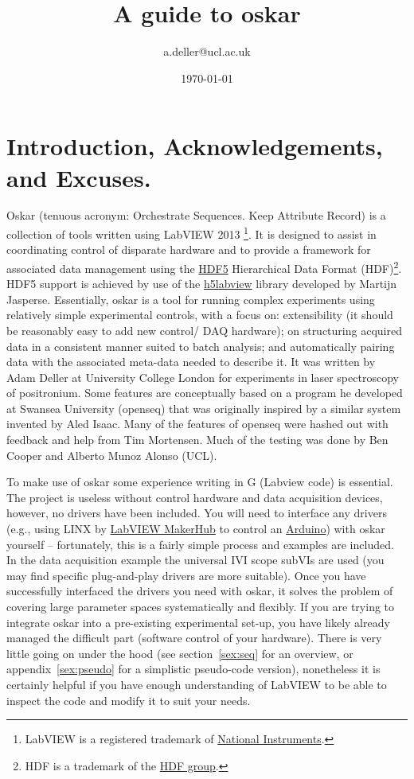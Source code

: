 \documentclass[10pt,a4paper]{article}
\title{A guide to oskar}
\author{a.deller@ucl.ac.uk}
\date{\today}
\begin{document}
\maketitle
\tableofcontents

\section{Introduction, Acknowledgements, and Excuses.}
Oskar (tenuous acronym: Orchestrate Sequences. Keep Attribute Record) is a collection of tools written using LabVIEW 2013 \footnote{LabVIEW is a registered trademark of \href{http://www.ni.com/}{National Instruments}.}. It is designed to assist in coordinating control of disparate hardware and to provide a framework for associated data management using the \href{https://www.hdfgroup.org/why_hdf/}{HDF5} Hierarchical Data Format (HDF)\footnote{HDF is a trademark of the \href{http://www.hdfgroup.org/}{HDF group}.}.   HDF5 support is achieved by use of the \href{http://h5labview.sourceforge.net/}{h5labview} library developed by Martijn Jasperse.  Essentially, oskar is a tool for running complex experiments using relatively simple experimental controls, with a focus on: extensibility (it should be reasonably easy to add new control/ DAQ hardware); on structuring acquired data in a consistent manner suited to batch analysis; and automatically pairing data with the associated meta-data needed to describe it.
It was written by Adam Deller at University College London for experiments in laser spectroscopy of positronium. Some features are conceptually based on a program he developed at Swansea University (openseq) that was originally inspired by a similar system invented by Aled Isaac.  Many of the features of openseq were hashed out with feedback and help from Tim Mortensen. Much of the testing was done by Ben Cooper and Alberto Munoz Alonso (UCL).

To make use of oskar some experience writing in G (Labview code) is essential. The project is useless without control hardware and data acquisition devices, however, no drivers have been included. You will need to interface any drivers (e.g., using  LINX by \href{https://www.labviewmakerhub.com}{LabVIEW MakerHub} to control an  \href{https://www.arduino.cc/}{Arduino}) with oskar yourself -- fortunately, this is a fairly simple process and examples are included.  In the data acquisition example the universal IVI scope subVIs are used (you may find specific plug-and-play drivers are more suitable).  Once you have successfully  interfaced the drivers you need with oskar, it solves the problem of covering large parameter spaces systematically and flexibly.  If you are trying to integrate oskar into a pre-existing experimental set-up, you have likely already managed the difficult part (software control of your hardware).  There is very little going on under the hood (see section~\ref{sex:seq} for an overview, or appendix~\ref{sex:pseudo} for a simplistic pseudo-code version),  nonetheless it is certainly helpful if you have enough understanding of LabVIEW to be able to inspect the code and modify it to suit your needs.
\end{document}
